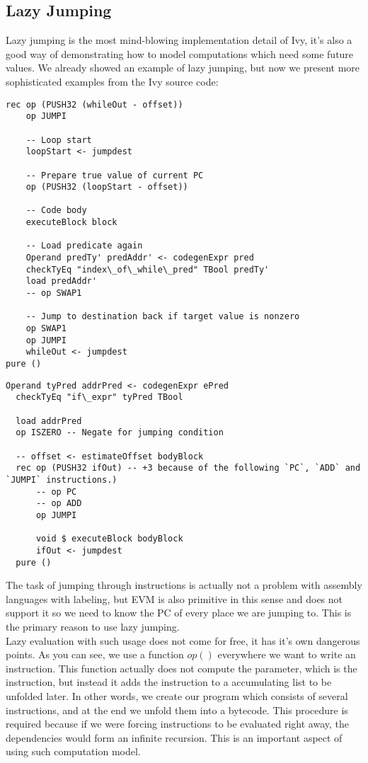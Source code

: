 \documentclass{article}
\begin{document}
\subsection{Lazy Jumping}
\label{lazy_jumping}
Lazy jumping is the most mind-blowing implementation detail of Ivy, it's also a good way of demonstrating how to model computations which need some future values. We already showed an example of lazy jumping, but now we present more sophisticated examples from the Ivy source code:
\begin{lstlisting}[label=lazy_while,caption=Lazily Jumped While Loop]
rec op (PUSH32 (whileOut - offset))
    op JUMPI

    -- Loop start
    loopStart <- jumpdest

    -- Prepare true value of current PC
    op (PUSH32 (loopStart - offset))

    -- Code body
    executeBlock block

    -- Load predicate again
    Operand predTy' predAddr' <- codegenExpr pred
    checkTyEq "index\_of\_while\_pred" TBool predTy'
    load predAddr'
    -- op SWAP1

    -- Jump to destination back if target value is nonzero
    op SWAP1
    op JUMPI
    whileOut <- jumpdest
pure ()
\end{lstlisting}
\begin{lstlisting}[label=lazy_if,caption=Lazily Jumped If Statement]
  Operand tyPred addrPred <- codegenExpr ePred
  checkTyEq "if\_expr" tyPred TBool

  load addrPred
  op ISZERO -- Negate for jumping condition

  -- offset <- estimateOffset bodyBlock
  rec op (PUSH32 ifOut) -- +3 because of the following `PC`, `ADD` and `JUMPI` instructions.)
      -- op PC
      -- op ADD
      op JUMPI

      void $ executeBlock bodyBlock
      ifOut <- jumpdest
  pure ()
\end{lstlisting}

The task of jumping through instructions is actually not a problem with assembly languages with labeling, but EVM is also primitive in this sense and does not support it so we need to know the PC of every place we are jumping to. This is the primary reason to use lazy jumping. \\

Lazy evaluation with such usage does not come for free, it has it's own dangerous points. As you can see, we use a function $op()$ everywhere we want to write an instruction. This function actually does not compute the parameter, which is the instruction, but instead it adds the instruction to a accumulating list to be unfolded later. In other words, we create our program which consists of several instructions, and at the end we unfold them into a bytecode. This procedure is required because if we were forcing instructions to be evaluated right away, the dependencies would form an infinite recursion. This is an important aspect of using such computation model.
\end{document}
